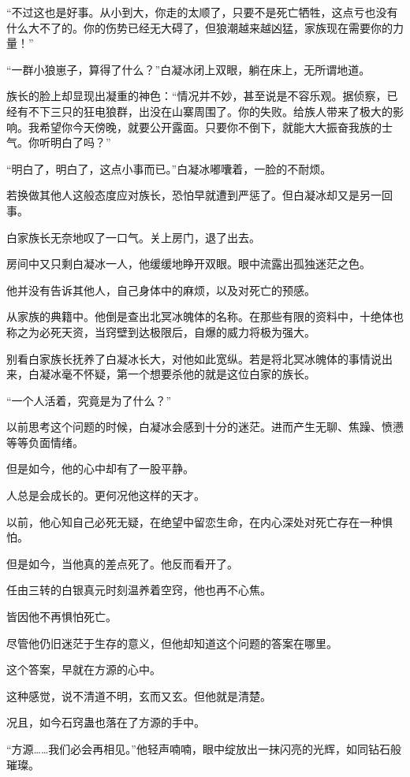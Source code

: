 \begin{this_body}
“不过这也是好事。从小到大，你走的太顺了，只要不是死亡牺牲，这点亏也没有什么大不了的。你的伤势已经无大碍了，但狼潮越来越凶猛，家族现在需要你的力量！”

“一群小狼崽子，算得了什么？”白凝冰闭上双眼，躺在床上，无所谓地道。

族长的脸上却显现出凝重的神色：“情况并不妙，甚至说是不容乐观。据侦察，已经有不下三只的狂电狼群，出没在山寨周围了。你的失败。给族人带来了极大的影响。我希望你今天傍晚，就要公开露面。只要你不倒下，就能大大振奋我族的士气。你听明白了吗？”

“明白了，明白了，这点小事而已。”白凝冰嘟囔着，一脸的不耐烦。

若换做其他人这般态度应对族长，恐怕早就遭到严惩了。但白凝冰却又是另一回事。

白家族长无奈地叹了一口气。关上房门，退了出去。

房间中又只剩白凝冰一人，他缓缓地睁开双眼。眼中流露出孤独迷茫之色。

他并没有告诉其他人，自己身体中的麻烦，以及对死亡的预感。

从家族的典籍中。他倒是查出北冥冰魄体的名称。在那些有限的资料中，十绝体也称之为必死天资，当窍壁到达极限后，自爆的威力将极为强大。

别看白家族长抚养了白凝冰长大，对他如此宽纵。若是将北冥冰魄体的事情说出来，白凝冰毫不怀疑，第一个想要杀他的就是这位白家的族长。

“一个人活着，究竟是为了什么？”

以前思考这个问题的时候，白凝冰会感到十分的迷茫。进而产生无聊、焦躁、愤懑等等负面情绪。

但是如今，他的心中却有了一股平静。

人总是会成长的。更何况他这样的天才。

以前，他心知自己必死无疑，在绝望中留恋生命，在内心深处对死亡存在一种惧怕。

但是如今，当他真的差点死了。他反而看开了。

任由三转的白银真元时刻温养着空窍，他也再不心焦。

皆因他不再惧怕死亡。

尽管他仍旧迷茫于生存的意义，但他却知道这个问题的答案在哪里。

这个答案，早就在方源的心中。

这种感觉，说不清道不明，玄而又玄。但他就是清楚。

况且，如今石窍蛊也落在了方源的手中。

“方源……我们必会再相见。”他轻声喃喃，眼中绽放出一抹闪亮的光辉，如同钻石般璀璨。


\end{this_body}
